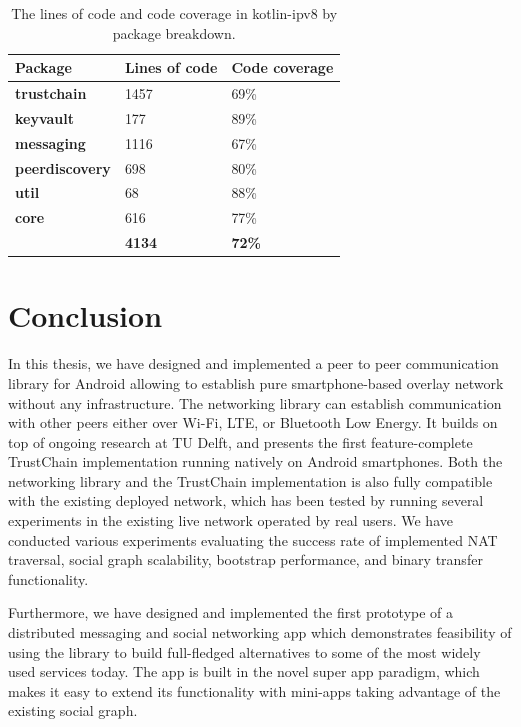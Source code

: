 \begin{table}[h]
    \centering
    \begin{tabular}{ | l | l | l | }
        \hline
        \textbf{Package} & \textbf{Lines of code} & \textbf{Code coverage} \\
        \hline
        \textbf{trustchain} & 1457 & 69\% \\
        \textbf{keyvault} & 177 & 89\% \\
        \textbf{messaging} & 1116 & 67\% \\
        \textbf{peerdiscovery} & 698 & 80\% \\
        \textbf{util} & 68 & 88\% \\
        \textbf{core} & 616 & 77\% \\
        \hline
        & \textbf{4134} & \textbf{72\%} \\
        \hline
    \end{tabular}
    \caption{The lines of code and code coverage in kotlin-ipv8 by package breakdown.}
    \label{codecov}
\end{table}




\chapter{Conclusion}
\label{conclusion}

In this thesis, we have designed and implemented a peer to peer communication library for Android allowing to establish pure smartphone-based overlay network without any infrastructure. The networking library can establish communication with other peers either over Wi-Fi, LTE, or Bluetooth Low Energy. It builds on top of ongoing research at TU Delft, and presents the first feature-complete TrustChain implementation running natively on Android smartphones. Both the networking library and the TrustChain implementation is also fully compatible with the existing deployed network, which has been tested by running several experiments in the existing live network operated by real users. We have conducted various experiments evaluating the success rate of implemented NAT traversal, social graph scalability, bootstrap performance, and binary transfer functionality.

Furthermore, we have designed and implemented the first prototype of a distributed messaging and social networking app which demonstrates feasibility of using the library to build full-fledged alternatives to some of the most widely used services today. The app is built in the novel super app paradigm, which makes it easy to extend its functionality with mini-apps taking advantage of the existing social graph.

